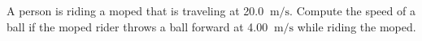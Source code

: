 A person is riding a moped that is traveling at 20.0 $\ \mathrm{m}/\mathrm{s}$. 
Compute the speed of a ball if the moped rider throws a ball forward at 4.00 $\ \mathrm{m}/\mathrm{s}$ 
while riding the moped.
